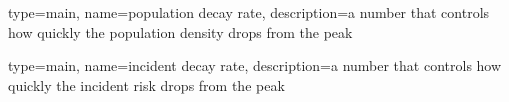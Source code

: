 

{%
   type=main,
   name={population decay rate},
   description={a number that controls how quickly the population density drops from the peak}
}

{%
   type=main,
   name={incident decay rate},
   description={a number that controls how quickly the incident risk drops from the peak}
}




